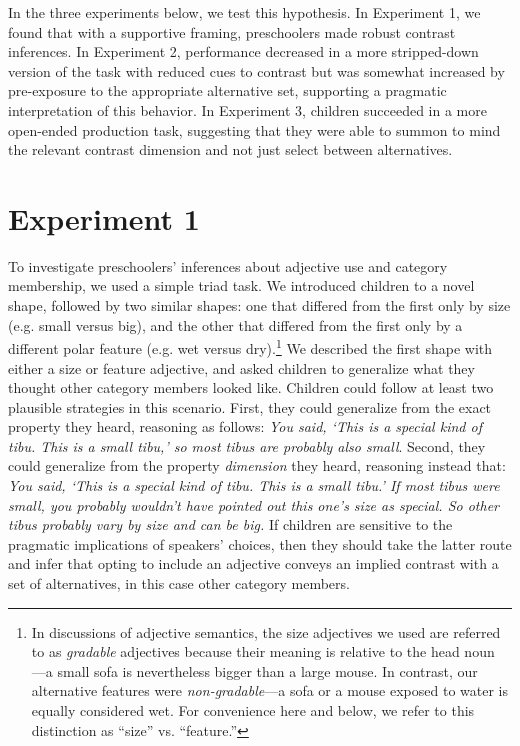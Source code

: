 \documentclass[man]{apa2}
\begin{document}
In the three experiments below, we test this hypothesis. In Experiment 1, we found that with a supportive framing, preschoolers made robust contrast inferences.  In Experiment 2, performance decreased in a more stripped-down version of the task with reduced cues to contrast but was somewhat increased by pre-exposure to the appropriate alternative set, supporting a pragmatic interpretation of this behavior. In Experiment 3, children succeeded in a more open-ended production task, suggesting that they were able to summon to mind the relevant contrast dimension and not just select between alternatives.

\section{Experiment 1}

To investigate preschoolers' inferences about adjective use and category membership, we used a simple triad task.  We introduced children to a novel shape, followed by two similar shapes: one that differed from the first only by size (e.g. small versus big), and the other that differed from the first only by a different polar feature (e.g. wet versus dry).\footnote{In discussions of adjective semantics, the size adjectives we used are referred to as \emph{gradable} adjectives because their meaning is relative to the head noun \cite{kennedy2012}---a small sofa is nevertheless bigger than a large mouse. In contrast, our alternative features were \emph{non-gradable}---a sofa or a mouse exposed to water is equally considered wet. For convenience here and below, we refer to this distinction as ``size'' vs. ``feature.''} We described the first shape with either a size or feature adjective, and asked children to generalize what they thought other category members looked like. Children could follow at least two plausible strategies in this scenario. First, they could generalize from the exact property they heard, reasoning as follows: \emph{You said, `This is a special kind of tibu. This is a small tibu,' so most tibus are probably also small}. Second, they could generalize from the property \emph{dimension} they heard, reasoning instead that: \emph{You said, `This is a special kind of tibu. This is a small tibu.' If most tibus were small, you probably wouldn't have pointed out this one's size as special. So other tibus probably vary by size and can be big.} If children are sensitive to the pragmatic implications of speakers' choices, then they should take the latter route and infer that opting to include an adjective conveys an implied contrast with a set of alternatives, in this case other category members. 
\end{document}
